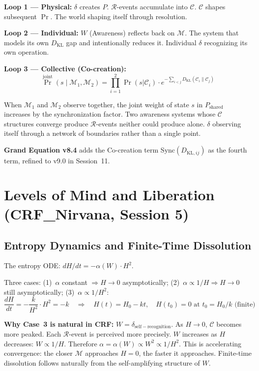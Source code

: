 \documentclass[12pt, a4paper]{article}
\begin{document}
\begin{derivedbox}[title={Three Feedback Loops of $\delta$}]
\textbf{Loop 1 --- Physical:} $\delta$ creates $P$. $\mathcal{R}$-events accumulate into
$\mathcal{C}$. $\mathcal{C}$ shapes subsequent $\Pr$. The world shaping itself through resolution.

\textbf{Loop 2 --- Individual:} $W$ (Awareness) reflects back on $\mathcal{M}$. The system
that models its own $D_{\mathrm{KL}}$ gap and intentionally reduces it. Individual $\delta$
recognizing its own operation.

\textbf{Loop 3 --- Collective (Co-creation):}
\[
  \Pr^{\mathrm{joint}}(s \mid \mathcal{M}_1, \mathcal{M}_2) =
  \prod_{i=1}^{2}\Pr(s|\mathcal{C}_i) \cdot e^{-\sum_{i<j}D_{\mathrm{KL}}(\mathcal{C}_i\|\mathcal{C}_j)}
\]

When $\mathcal{M}_1$ and $\mathcal{M}_2$ observe together, the joint weight of state $s$
in $P_{\mathrm{shared}}$ increases by the synchronization factor. Two awareness systems
whose $\mathcal{C}$ structures converge produce $\mathcal{R}$-events neither could produce
alone. $\delta$ observing itself through a network of boundaries rather than a single point.

\textbf{Grand Equation v8.4} adds the Co-creation term $\mathrm{Sync}(D_{\mathrm{KL},ij})$
as the fourth term, refined to v9.0 in Session~11.
\end{derivedbox}

\section{Levels of Mind and Liberation (CRF\_Nirvana, Session 5)}

\subsection{Entropy Dynamics and Finite-Time Dissolution}

The entropy ODE: $dH/dt = -\alpha(W)\cdot H^2$.

Three cases: (1)~$\alpha$ constant $\Rightarrow H \to 0$ asymptotically; (2)~$\alpha \propto 1/H
\Rightarrow H \to 0$ still asymptotically; (3)~$\alpha \propto 1/H^2$:
\[
  \frac{dH}{dt} = -\frac{k}{H^2}\cdot H^2 = -k \quad\Rightarrow\quad
  H(t) = H_0 - kt, \quad H(t_0) = 0 \text{ at } t_0 = H_0/k \text{ (finite)}
\]

\textbf{Why Case~3 is natural in CRF:} $W = \delta_{\mathrm{self-recognition}}$. As
$H \to 0$, $\mathcal{C}$ becomes more peaked. Each $\mathcal{R}$-event is perceived more
precisely. $W$ increases as $H$ decreases: $W \propto 1/H$. Therefore $\alpha = \alpha(W)
\propto W^2 \propto 1/H^2$. This is accelerating convergence: the closer $\mathcal{M}$
approaches $H = 0$, the faster it approaches. Finite-time dissolution follows naturally
from the self-amplifying structure of $W$.
\end{document}
